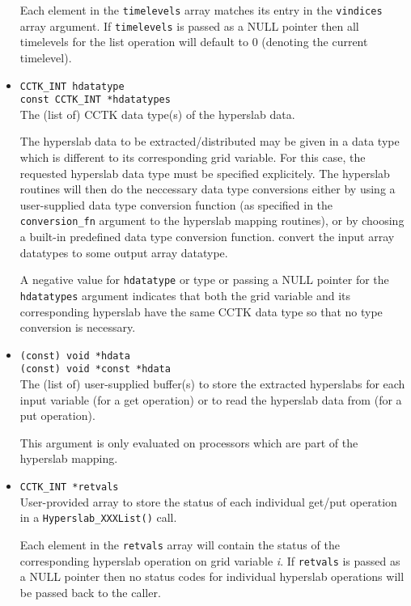 \documentclass{article}
\begin{document}
\begin{itemize}
    Each element in the {\tt timelevels} array matches its entry in the
    {\tt vindices} array argument.
    If {\tt timelevels} is passed as a NULL pointer then all timelevels for
    the list operation will default to 0 (denoting the current timelevel).

  \item{\tt CCTK\_INT hdatatype\\
    const CCTK\_INT *hdatatypes}\\
    The (list of) CCTK data type(s) of the hyperslab data.

    The hyperslab data to be extracted/distributed may be given in a data type
    which is different to its corresponding grid variable. For this case,
    the requested hyperslab data type must be specified explicitely.
    The hyperslab routines will then do the neccessary data type conversions
    either by using a user-supplied data type conversion function (as specified
    in the {\tt conversion\_fn} argument to the hyperslab mapping routines),
    or by choosing a built-in predefined data type conversion function.
    convert the input array datatypes to some output array datatype.

    A negative value for {\tt hdatatype} or type or passing a NULL pointer for
    the {\tt hdatatypes} argument indicates that both the grid variable and
    its corresponding hyperslab have the same CCTK data type so that no type
    conversion is necessary.

  \item{\tt (const) void *hdata\\
    (const) void *const *hdata}\\
    The (list of) user-supplied buffer(s) to store the extracted hyperslabs for
    each input variable (for a get operation) or to read the hyperslab data
    from (for a put operation).

    This argument is only evaluated on processors which are part of the
    hyperslab mapping.

  \item{\tt CCTK\_INT *retvals}\\
    User-provided array to store the status of each individual get/put
    operation in a {\tt Hyperslab\_XXXList()} call.

    Each element in the {\tt retvals} array will contain the status of the
    corresponding hyperslab operation on grid variable {\it i}.
    If {\tt retvals} is passed as a NULL pointer then no status codes for
    individual hyperslab operations will be passed back to the caller.
\end{itemize}
\end{document}
